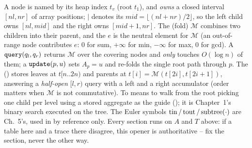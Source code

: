 A node is named by its heap index \(t_v\) (root \(t_1\)), and \emph{owns} a
closed interval \([nl,nr]\) of array positions; \(\mid\) denotes its
 \(mid=\lfloor(nl{+}nr)/2\rfloor\), so the left child owns
\([nl,mid]\) and the right owns \([mid{+}1,nr]\).  The  (fold)
\(\mathcal{M}\) combines two children into their parent, and the
 \(e\) is the neutral element for \(\mathcal{M}\) (an out-of-range
node contributes \(e\): \(0\) for sum, \(+\infty\) for min, \(-\infty\) for max,
\(0\) for gcd).  A  \(\texttt{query}(q_l,q_r)\) returns
\(\mathcal{M}\) over the covering nodes and \emph{only} touches \(O(\log n)\)
of them; a  \(\texttt{update}(p,u)\) sets \(A_p=u\) and
re-folds the single root path through \(p\).  The 
() stores leaves at \(t[n..2n)\) and parents at
\(t[i]=\mathcal{M}(t[2i],t[2i{+}1])\), answering a \emph{half-open}
\([l,r)\) query with a left and a right accumulator (order matters when
\(\mathcal{M}\) is not commutative).  To  means to walk from the
root picking one child per level using a stored aggregate as the guide
(); it is Chapter~1's binary search executed on the tree.
The Euler symbols \(\operatorname{tin}/\operatorname{tout}/\operatorname{subtree}(\cdot)\) are Ch.~5's, used in
 by reference only.  Every section runs on \(A\) and \(T\)
above: if a table here and a trace there disagree, this opener is authoritative
-- fix the section, never the other way.
